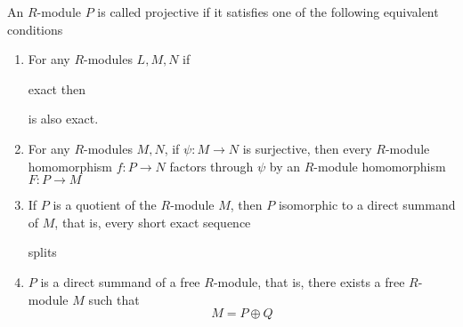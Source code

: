 \begin{definition}
	An $R$-module $P$ is called projective if it satisfies one of the following equivalent conditions
	\begin{enumerate}
		\item For any $R$-modules $L, M, N$ if
		\begin{center}
		\end{center}
		
		exact then
		\begin{center}
		\end{center}
		
		is also exact.
		
		\item For any $R$-modules $M, N$, if $\psi: M \to N$ is surjective, then every $R$-module homomorphism $f: P \to N$ factors through $\psi$ by an $R$-module homomorphism $F: P \to M$
		\begin{center}
		\end{center}
		
		\item If $P$ is a quotient of the $R$-module $M$, then $P$ isomorphic to a direct summand of $M$, that is, every short exact sequence 
		\begin{center}
		\end{center}
		
		splits
		
		\item $P$ is a direct summand of a free $R$-module, that is, there exists a free $R$-module $M$ such that 
		$$
			M = P \oplus Q
		$$
	\end{enumerate}
\end{definition}

